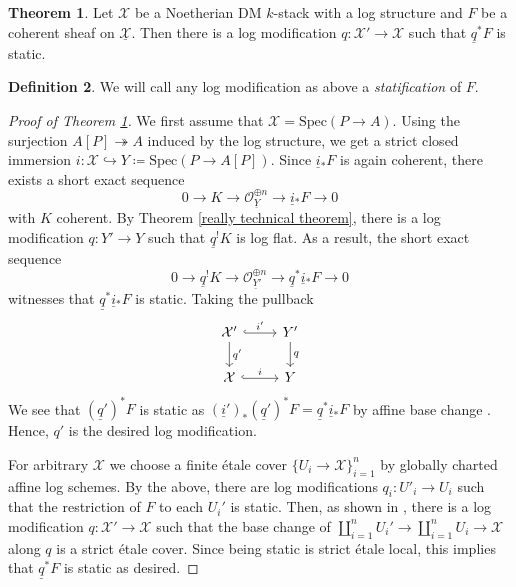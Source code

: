\documentclass[11pt]{amsart}
\theoremstyle{definition}
\theoremstyle{definition}
\newtheorem{theorem}{Theorem}[subsection]
\newtheorem{definition}[theorem]{Definition}
\newcommand{\ul}[1]{\underline{#1}}
\begin{document}
\begin{theorem}\label{thm-pullback-static}
Let $\mathcal{X}$ be a Noetherian DM $k$-stack with a log structure and $F$ be a coherent sheaf on $\ul{\mathcal{X}}$. Then there is a log modification $q\colon \mathcal{X}'\rightarrow \mathcal{X}$ such that $\ul{q}^{*}F$ is static.
\end{theorem}
\begin{definition}
    We will call any log modification as above a \textit{statification} of $F$.
\end{definition}
\begin{proof}[Proof of Theorem \ref{thm-pullback-static}]
We first assume that $\mathcal{X}=\text{Spec}(P\rightarrow A)$. Using the surjection $A[P]\twoheadrightarrow A$ induced by the log structure, we get a strict closed immersion $i\colon \mathcal{X}\hookrightarrow Y\coloneqq \text{Spec}(P\rightarrow A[P])$.
Since $\ul{i}{}_{*}F$ is again coherent, there exists a short exact sequence 
\[0\longrightarrow K\longrightarrow \mathcal{O}_{\ul{Y}}^{\oplus n}\longrightarrow \ul{i}{}_{*}F\longrightarrow 0\]
with $K$ coherent.
By Theorem \ref{really technical theorem}, there is a log modification $q\colon Y'\rightarrow Y$ such that $\ul{q}^{!}K$ is log flat. As a result, the short exact sequence 
\[0\longrightarrow \ul{q}^{!}K\longrightarrow \mathcal{O}_{\ul{Y}'}^{\oplus n}\longrightarrow \ul{q}^{*}\ul{i}{}_{*}F\longrightarrow 0\]
witnesses that $\ul{q}^{*}\ul{i}{}_{*}F$ is static. 
Taking the pullback 
\begin{equation*}
\begin{tikzcd}
\mathcal{X}' \arrow[r, "i'",hook] \arrow[d, "q'"] & Y' \arrow[d, "q"] \\
\mathcal{X} \arrow[r, "i",hook]                                   & Y                         
\end{tikzcd}
\end{equation*}
We see that $(\ul{q}')^{*}F$ is static as $(\ul{i}')_{*}(\ul{q}')^{*}F=\ul{q}^{*}\ul{i}{}_{*}F$ by affine base change \cite[02KG]{stacks}. Hence, $q'$ is the desired log modification.

For arbitrary $\mathcal{X}$ we choose a finite \'etale cover $\{U_i\rightarrow \mathcal{X}\}_{i=1}^n$ by globally charted affine log schemes. By the above, there are log modifications $q_i\colon U'_i\rightarrow U_i$ such that the restriction of $F$ to each $U_i'$ is static. Then, as shown in \cite{m-type-topology}, there is a log modification $q\colon \mathcal{X}'\rightarrow \mathcal{X}$ such that the base change of $\coprod_{i=1}^n U_i'\rightarrow \coprod_{i=1}^n U_i\rightarrow \mathcal{X}$ along $q$ is a strict \'etale cover. Since being static is strict \'etale local, this implies that $\ul{q}^* F$ is static as desired.
\end{proof}
\end{document}
